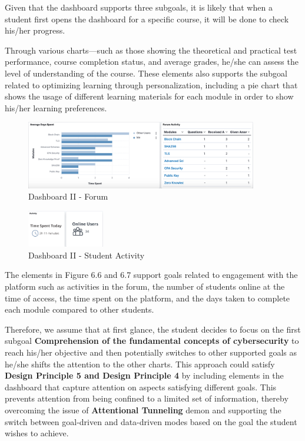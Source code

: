 Given that the dashboard supports three subgoals, it is likely that when a student first opens the dashboard for a specific course, it will be done to check his/her progress. 

Through various charts—such as those showing the theoretical and practical test performance, course completion status, and average grades, he/she can assess the level of understanding of the course. 
These elements also supports the subgoal related to optimizing learning through personalization, including a pie chart that shows the usage of different learning materials for each module in order to show his/her learning preferences. 

\begin{figure}[H]
    \centering
    \includegraphics[width=0.9\textwidth]{assets/forum2.png}
    \caption{Dashboard II - Forum}
    \label{fig:dashboard_2}
\end{figure}

\begin{figure}[H]
    \centering
    \includegraphics[width=0.3\textwidth]{assets/activity2.png}
    \caption{Dashboard II - Student Activity}
    \label{fig:dashboard_2}
\end{figure}

The elements in Figure 6.6 and 6.7 support goals related to engagement with the platform such as activities in the forum, the number of students online at the time of access, the time spent on the platform, and the days taken to complete each module compared to other students.

Therefore, we assume that at first glance, the student decides to focus on the first subgoal \textbf{Comprehension of the fundamental concepts of cybersecurity} to reach his/her objective and then potentially switches to other supported goals as he/she shifts the attention to the other charts. This approach could satisfy \textbf{Design Principle 5 and Design Principle 4} by including elements in the dashboard that capture attention on aspects satisfying different goals. This prevents attention from being confined to a limited set of information, thereby overcoming the issue of \textbf{Attentional Tunneling} demon and supporting the switch between goal-driven and data-driven modes based on the goal the student wishes to achieve.

